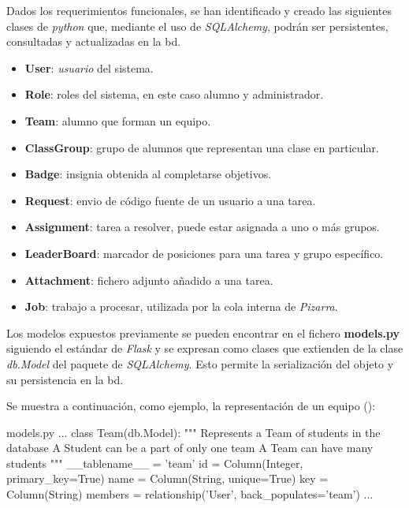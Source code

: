 \documentclass[11pt,spanish,listoffigures,listoftables]{tfgetsinf}
\begin{document}
Dados los requerimientos funcionales, se han identificado y creado las siguientes clases de \textit{python} que, mediante el uso de \textit{SQLAlchemy}, podrán ser persistentes, consultadas y actualizadas en la \acrfull{bd}.

\begin{itemize}
	\item \textbf{User}: \textit{usuario} del sistema.
	\item \textbf{Role}: roles del sistema, en este caso \gls{alumno} y \gls{administrador}.
	\item \textbf{Team}: \gls{alumno} que forman un \gls{equipo}.
	\item \textbf{ClassGroup}: \gls{grupo} de \gls{alumno}s que representan una clase en particular.
	\item \textbf{Badge}: \Gls{insignia} obtenida al completarse objetivos.
	\item \textbf{Request}: \gls{envio} de código fuente de un usuario a una \Gls{tarea}.
	\item \textbf{Assignment}: \Gls{tarea} a resolver, puede estar asignada a uno o más grupos.
	\item \textbf{LeaderBoard}: marcador de posiciones para una \Gls{tarea} y \Gls{grupo} específico.
	\item \textbf{Attachment}: fichero adjunto añadido a una \Gls{tarea}.
	\item \textbf{Job}: trabajo a procesar, utilizada por la \Gls{cola} interna de \textit{Pizarra}.
\end{itemize}

Los modelos expuestos previamente se pueden encontrar en el fichero \textbf{models.py} siguiendo el estándar de \textit{Flask} y se expresan como clases que extienden de la clase \textit{db.Model} del paquete de \textit{SQLAlchemy}. Esto permite la serialización del objeto y su persistencia en la \Gls{bd}. 

Se muestra a continuación, como ejemplo, la representación de un \gls{equipo} ():

\begin{code}{models.py}
	...
	class Team(db.Model):
	"""
	Represents a Team of students in the database
	A Student can be a part of only one team
	A Team can have many students
	"""
	__tablename__ = 'team'
	id = Column(Integer, primary_key=True)
	name = Column(String, unique=True)
	key = Column(String)
	members = relationship('User', back_populates='team')
	...
\end{code}
\end{document}

